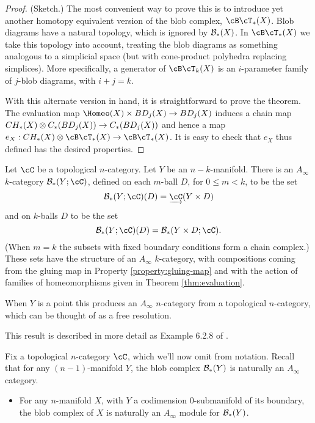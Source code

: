 \documentclass{pnastwo}
\begin{document}
\begin{article}
\begin{proof}(Sketch.)
The most convenient way to prove this is to introduce yet another homotopy equivalent version of
the blob complex, $\cB\cT_*(X)$.
Blob diagrams have a natural topology, which is ignored by ${\mathcal B}_*(X)$.
In $\cB\cT_*(X)$ we take this topology into account, treating the blob diagrams as something
analogous to a simplicial space (but with cone-product polyhedra replacing simplices).
More specifically, a generator of $\cB\cT_k(X)$ is an $i$-parameter family of $j$-blob diagrams, with $i+j=k$.

With this alternate version in hand, it is straightforward to prove the theorem.
The evaluation map $\Homeo(X)\times BD_j(X)\to BD_j(X)$
induces a chain map $CH_*(X)\otimes C_*(BD_j(X))\to C_*(BD_j(X))$
and hence a map $e_X: \CH{X} \tensor \cB\cT_*(X) \to \cB\cT_*(X)$.
It is easy to check that $e_X$ thus defined has the desired properties.
\end{proof}

\begin{thm}
\label{thm:blobs-ainfty}
Let $\cC$ be  a topological $n$-category.
Let $Y$ be an $n{-}k$-manifold. 
There is an $A_\infty$ $k$-category $\bc_*(Y;\cC)$, defined on each $m$-ball $D$, for $0 \leq m < k$, 
to be the set $$\bc_*(Y;\cC)(D) = \cl{\cC}(Y \times D)$$ and on $k$-balls $D$ to be the set 
$$\bc_*(Y;\cC)(D) = \bc_*(Y \times D; \cC).$$ 
(When $m=k$ the subsets with fixed boundary conditions form a chain complex.) 
These sets have the structure of an $A_\infty$ $k$-category, with compositions coming from the gluing map in 
Property \ref{property:gluing-map} and with the action of families of homeomorphisms given in Theorem \ref{thm:evaluation}.
\end{thm}
\begin{rem}
When $Y$ is a point this produces an $A_\infty$ $n$-category from a topological $n$-category, 
which can be thought of as a free resolution.
\end{rem}
This result is described in more detail as Example 6.2.8 of \cite{1009.5025}.

Fix a topological $n$-category $\cC$, which we'll now omit from notation.
Recall that for any $(n-1)$-manifold $Y$, the blob complex ${\mathcal B}_*(Y)$ is naturally an $A_\infty$ category.

\begin{thm}
\label{thm:gluing}
\mbox{}%
\begin{itemize}
\item For any $n$-manifold $X$, with $Y$ a codimension $0$-submanifold of its boundary, the blob complex of $X$ is naturally an
$A_\infty$ module for ${\mathcal B}_*(Y)$.


\end{itemize}
\end{thm}
\end{article}
\end{document}

